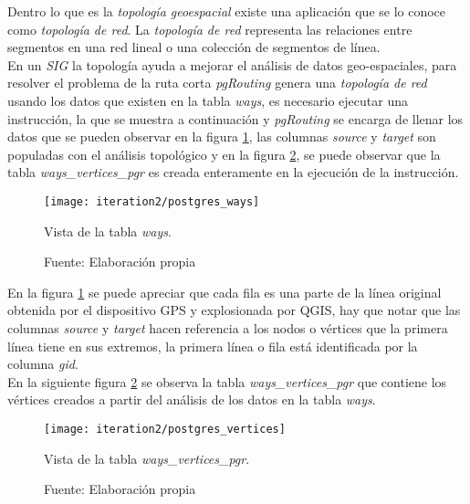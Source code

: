 Dentro lo que es la \emph{topología geoespacial} existe una aplicación que se lo conoce como \emph{topología de red}. La \emph{topología de red} representa las relaciones entre segmentos en una red lineal o una colección de segmentos de línea. \cite{osgeo_journal_topology} \\

En un \emph{SIG} la topología ayuda a mejorar el análisis de datos geo-espaciales, para resolver el problema de la ruta corta \emph{pgRouting} genera una \emph{topología de red} usando los datos que existen en la tabla \emph{ways}, es necesario ejecutar una instrucción, la que se muestra a continuación y \emph{pgRouting} se encarga de llenar los datos que se pueden observar en la figura \ref{fig:postgres_ways}, las columnas \emph{source} y \emph{target} son populadas con el análisis topológico y en la figura \ref{fig:postgres_vertices}, se puede observar que la tabla \emph{ways\_vertices\_pgr} es creada enteramente en la ejecución de la instrucción.\\

\begin{figure}[H]
  \begin{center}
    \texttt{[image: iteration2/postgres\_ways]}
    \caption{Vista de la tabla \emph{ways}.}
    \label{fig:postgres_ways}
    \caption*{Fuente: Elaboración propia}
  \end{center}
\end{figure}

En la figura \ref{fig:postgres_ways} se puede apreciar que cada fila es una parte de la línea original obtenida por el dispositivo GPS y explosionada por QGIS, hay que notar que las columnas \emph{source} y \emph{target} hacen referencia a los nodos o vértices que la primera línea tiene en sus extremos, la primera línea o fila está identificada por la columna \emph{gid}.\\

En la siguiente figura \ref{fig:postgres_vertices} se observa la tabla \emph{ways\_vertices\_pgr} que contiene los vértices creados a partir del análisis de los datos en la tabla \emph{ways}.

\begin{figure}[H]
  \begin{center}
    \texttt{[image: iteration2/postgres\_vertices]}
    \caption{Vista de la tabla \emph{ways\_vertices\_pgr}.}
    \label{fig:postgres_vertices}
    \caption*{Fuente: Elaboración propia}
  \end{center}
\end{figure}

